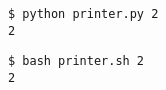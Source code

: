 \documentclass{article}
\begin{document}
\begin{verbatim}
$ python printer.py 2 
2
\end{verbatim}


\begin{verbatim}
$ bash printer.sh 2 
2
\end{verbatim}
\end{document}
